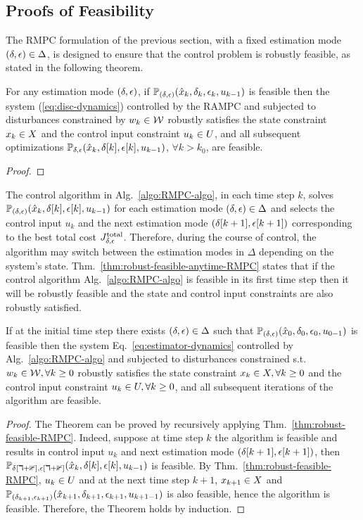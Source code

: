 \subsection{Proofs of Feasibility}
The RMPC formulation of the previous section, with a fixed estimation mode
$\left(\delta,\epsilon\right)\in\Delta$, is designed to ensure that the control problem is robustly feasible, as stated in the following theorem.
\begin{thm}
\label{thm:robust-feasible-RMPC} For
any estimation mode $\left(\delta,\epsilon\right)$, if $\mathbb{P}_{(\delta,\epsilon)}(\hat{x}_{k},\delta_{k},\epsilon_{k},u_{k -1})$
is feasible then the system (\ref{eq:disc-dynamics}) controlled by
the RAMPC and subjected to disturbances constrained by $w_k \in \mathcal{W}$
robustly satisfies the state constraint $x_k \in X$
and the control input constraint $u_k \in U$, and
all subsequent optimizations $\mathbb{P_{\delta,\epsilon}}(\hat{x}_{k},\delta[k],\epsilon[k],u_{k-1})$,
$\forall k>k_{0}$, are feasible.
\end{thm}
\begin{proof}

\end{proof}
The control algorithm in Alg.~\ref{algo:RMPC-algo}, in each time step $k$, solves $\mathbb{P_{(\delta,\epsilon)}}(\hat{x}_{k},\delta[k],\epsilon[k],u_{k-1})$ for each estimation mode $\left(\delta,\epsilon\right)\in\Delta$ and selects the control input $u_{k}$ and the next estimation mode $\left(\delta[k+1],\epsilon[k+1]\right)$
corresponding to the best total cost $J_{\delta,\epsilon}^{\mathrm{total}}$.
Therefore, during the course of control, the algorithm may switch between the estimation modes in $\Delta$ depending on the system's state. Thm.~\ref{thm:robust-feasible-anytime-RMPC} states that if the control algorithm Alg.~\ref{algo:RMPC-algo} is feasible in its first time step then it will be robustly feasible and the state and control input constraints are also robustly satisfied.
\begin{thm}%
\label{thm:robust-feasible-anytime-RMPC}
If at the initial time step there exists $\left(\delta,\epsilon\right)\in\Delta$
such that $\mathbb{P}_{(\delta,\epsilon)}(\hat{x}_{0},\delta_{0},\epsilon_{0},u_{0 -1})$
is feasible then the system Eq.~\ref{eq:estimator-dynamics} controlled by
Alg.~\ref{algo:RMPC-algo} and subjected to disturbances constrained
s.t. $w_k\in \mathcal{W},\forall k\geq0$ robustly satisfies the state constraint
$x_k\in X,\forall k\geq0$ and the control input constraint $u_k\in U,\forall k\geq0$,
and all subsequent iterations of the algorithm are feasible.
\end{thm}
\begin{proof}
The Theorem can be proved by recursively applying Thm.~\ref{thm:robust-feasible-RMPC}.
Indeed, suppose at time step $k$ the algorithm
is feasible and results in control input $u_{k}$ and next estimation
mode $\left(\delta[k+1],\epsilon[k+1]\right)$, then $\mathbb{P_{\delta[k+1],\epsilon[k+1]}}(\hat{x}_{k},\delta[k],\epsilon[k],u_{k-1})$
is feasible. By Thm.~\ref{thm:robust-feasible-RMPC}, $u_{k}\in U$ and
at the next time step $k+1$, $x_{k+1}\in X$ and $\mathbb{P}_{(\delta_{k+1},\epsilon_{k+1})}(\hat{x}_{k+1},\delta_{k+1},\epsilon_{k+1},u_{k+1 -1})$
is also feasible, hence the algorithm is feasible.
Therefore, the Theorem holds by induction.
\end{proof}


